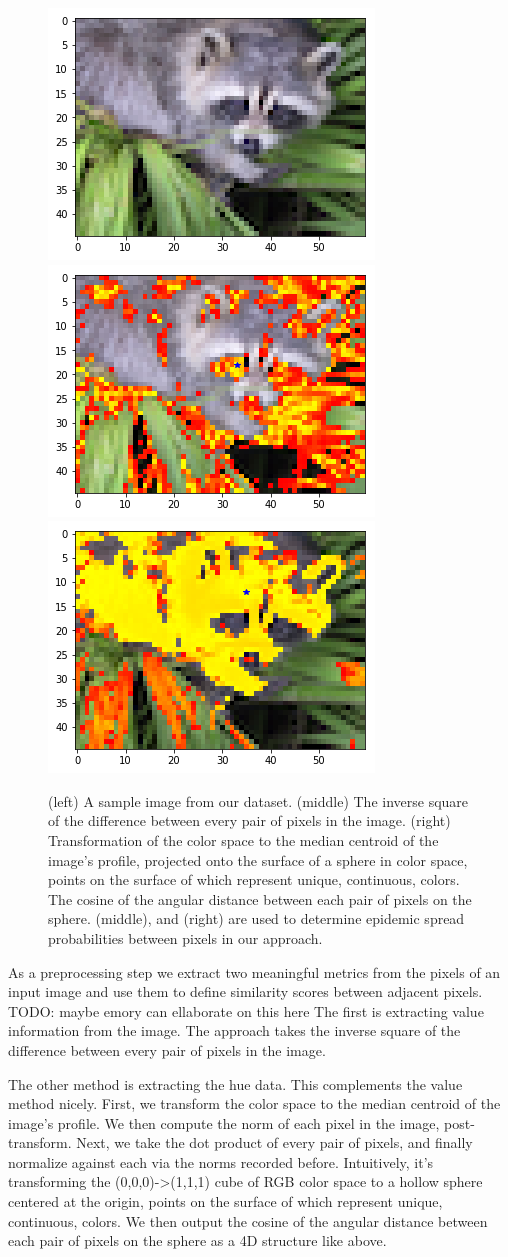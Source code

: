 \documentclass[twocolumn]{article}
\newcommand{\todo}[1]{}
\renewcommand{\todo}[1]{{\color{red} TODO: {#1}}}
\newcommand{\figlab}[1]{\label{fig:#1}}
\begin{document}
\begin{figure}
\centering

\includegraphics[width=0.3\linewidth]{figs/input.png}
\includegraphics[width=0.3\linewidth]{figs/alpha.png}
\includegraphics[width=0.3\linewidth]{figs/beta.png}

\caption{
(left) A sample image from our dataset.
(middle) The inverse square of the difference between every pair of pixels in
the image. 
(right) Transformation of the color space to the median centroid of the image's
profile, projected onto the surface of a sphere in color space, points on the
surface of which represent unique, continuous, colors. The cosine of the angular
distance between each pair of pixels on the sphere.
(middle), and (right) are used to determine epidemic spread probabilities
between pixels in our approach.
}
\figlab{alpha_beta}
\end{figure}

As a preprocessing step we extract two meaningful metrics from the pixels of an
input image and use them to define similarity scores between adjacent pixels.
\todo{maybe emory can ellaborate on this here}
The first is extracting value information from the image.
The approach takes the inverse square of the difference between every pair of
pixels in the image. 

The other method is extracting the hue data. This complements the value method
nicely.  First, we transform the color space to the median centroid of the
image's profile. We then compute the norm of each pixel in the image,
post-transform.  Next, we take the dot product of every pair of pixels, and
finally normalize against each via the norms recorded before.  Intuitively, it's
transforming the (0,0,0)->(1,1,1) cube of RGB color space to a hollow sphere
centered at the origin, points on the surface of which represent unique,
continuous, colors. We then output the cosine of the angular distance between
each pair of pixels on the sphere as a 4D structure like above.
\end{document}
